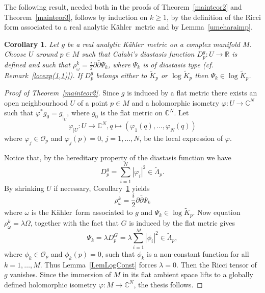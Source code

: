 \documentclass[12pt]{amsart}
\newcommand{\R}{\mathbb{R}}
\newcommand{\C}{\mathbb{C}}
\newcommand{\K}{K\"{a}hler}
\newcommand{\CO}{{\mathcal{O}}}
\newtheorem{cor}{Corollary}
\begin{document}
The following result, needed both in the proofs of Theorem~\ref{mainteor2}
and Theorem~\ref{mainteor3}, follows  by induction on $k\geq 1$,  by the definition of the Ricci form associated to a real analytic \K\ metric and by Lemma~\ref{umeharaimp}.

\begin{cor}\label{corrhok}
Let $g$ be a real analytic \K\ metric on a complex manifold $M$.
Choose $U$ around $p\in M$ such that 
Calabi's diastasis function $D_p^g:U\rightarrow \R$ is defined 
and such that 
$\rho^k_\omega=\frac{i}{2}\partial\bar\partial \Psi_k$, where 
$\Psi_k$ is of diastasis type (cf. Remark~\ref{locexp(1,1)}).
If $D_p^g$ belongs either to
$\tilde K_p$ or  $\log\tilde K_p$ then $\Psi_k\in\log\tilde K_p$.
\end{cor}


\begin{proof}[Proof of Theorem~\ref{mainteor2}]
Since $g$ is induced by a flat metric there exists 
an open neighbourhood $U$ of a point $p\in M$ and a holomorphic isometry $\varphi:U\rightarrow \C^N$ such that $\varphi^*g_0=g_{\vert_U}$,
where $g_0$ is the flat metric on $\C^N$.
Let $$\varphi_{|U}:U\rightarrow \C^N, q\mapsto (\varphi_1(q), \dots , \varphi_N(q))$$
where $\varphi_j\in \CO_p$ and $\varphi_j(p)=0$, $j=1, \dots ,N$,
be the local expression of $\varphi$.

Notice that, by the hereditary property of the diastasis function  we  have 
\begin{equation}\label{Dpflat}
D^g_p =\sum_{i=1}^N \left|\varphi_i\right|^2\in\tilde\Lambda_p.
\end{equation}
By shrinking $U$ if necessary,  Corollary~\ref{corrhok} yields
\begin{equation}\label{ricciformkind}
\rho^k_\omega=\frac{i}{2}\partial\bar\partial\Psi_k
\end{equation} 
where $\omega$ is the \K\ form associated to $g$
and $\Psi_k\in\log\tilde K_p$.
Now equation $\rho^k_\omega=\lambda\Omega$, together 
with the fact that  $G$ is induced by the flat metric
gives
$$\Psi_k= \lambda D_p^G=\lambda\sum_{i=1}^M \left|\phi_i\right|^2\in\tilde\Lambda_p,$$
 where $\phi_k\in \CO_p$ and $\phi_k(p)=0$, 
 such that $\phi_k$ is  a  non-constant function for all $k=1, \dots ,M$.
 Thus Lemma~\ref{LemLogConst} forces  $\lambda =0$.
 Then the Ricci tensor of $g$ vanishes.
 Since the immersion of $M$ in its flat ambient space lifts to a globally defined holomorphic isometry $\varphi :M\rightarrow \C^N$, the thesis follows.
 \end{proof}
 
\end{document}
